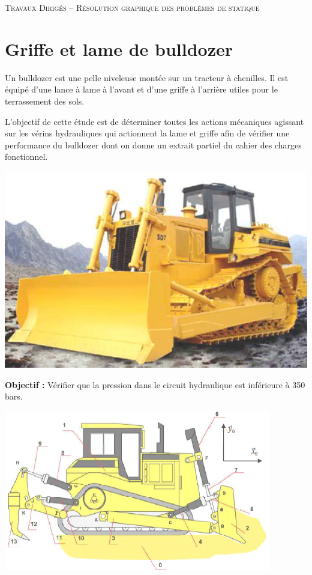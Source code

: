 \documentclass[10pt]{article}
\begin{document}

\begin{center}
\Large{\textsc{Travaux Dirigés -- Résolution graphique des problèmes de statique}}
\end{center}



\section*{Griffe et lame de bulldozer}
\setcounter{subparagraph}{0}

\begin{minipage}[c]{.6\linewidth}
Un bulldozer est une pelle niveleuse montée sur un tracteur à chenilles. Il est équipé d'une lance à lame à l'avant et d'une griffe à l'arrière utiles pour le terrassement des sols. 

L'objectif de cette étude est de déterminer toutes les actions mécaniques agissant sur les vérins hydrauliques qui actionnent la lame et griffe afin de vérifier une performance du bulldozer dont on donne un extrait partiel du cahier des charges fonctionnel.
\end{minipage}\hfill
\begin{minipage}[c]{.39\linewidth}
\begin{center}
\includegraphics[width=.8\textwidth]{images/img5}
\end{center}
\end{minipage}

\begin{obj}
\textbf{Objectif :}
Vérifier que la pression dans le circuit hydraulique est inférieure à 350 bars.

\end{obj}
\begin{center}
\includegraphics[width=.6\textwidth]{images/img6_bis}
\end{center}
\end{document}
